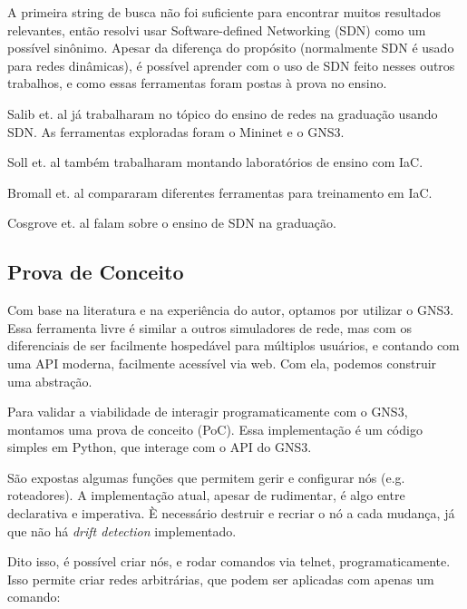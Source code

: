 \documentclass[12pt]{article}
\begin{document}
A primeira string de busca não foi suficiente para encontrar muitos resultados
relevantes, então resolvi usar Software-defined Networking (SDN) como um
possível sinônimo. Apesar da diferença do propósito (normalmente SDN é usado
para redes dinâmicas\cite{vsuh2017designing}), é possível aprender com o uso de
SDN feito nesses outros trabalhos, e como essas ferramentas foram postas à
prova no ensino\cite{salib2018hands}.

Salib et. al\cite{salib2018hands} já trabalharam no tópico do ensino de redes
na graduação usando SDN. As ferramentas exploradas foram o
Mininet\cite{mininet} e o GNS3\cite{gns3api}.

Soll et. al\cite{soll2023building} também trabalharam montando laboratórios de ensino com IaC.

Bromall et. al\cite{bromall2022comparison} compararam diferentes ferramentas para treinamento em IaC.

Cosgrove et. al\cite{cosgrove2016teaching} falam sobre o ensino de SDN na graduação.



\subsection{Prova de Conceito}

Com base na literatura e na experiência do autor, optamos por utilizar o
GNS3\cite{gns3api}. Essa ferramenta livre é similar a outros simuladores de
rede, mas com os diferenciais de ser facilmente hospedável para múltiplos
usuários, e contando com uma API moderna, facilmente acessível via web. Com
ela, podemos construir uma abstração.

Para validar a viabilidade de interagir programaticamente com o GNS3, montamos
uma prova de conceito (PoC). Essa implementação é um código simples em Python,
que interage com o API do GNS3\cite{gns3api}.

São expostas algumas funções que permitem gerir e configurar nós (e.g.
roteadores). A implementação atual, apesar de rudimentar, é algo entre
declarativa e imperativa. È necessário destruir e recriar o nó a cada mudança,
já que não há \textit{drift detection} implementado.

Dito isso, é possível criar nós, e rodar comandos via telnet,
programaticamente. Isso permite criar redes arbitrárias, que podem ser
aplicadas com apenas um comando:
\end{document}
